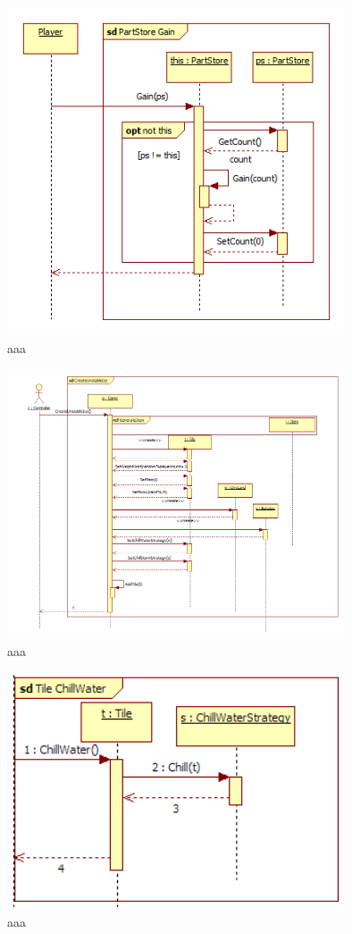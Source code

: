 \begin{figure}[H]
	\begin{center}
		\includegraphics[width=10cm]{chapters/chapter03/seqdiag/PartStore_Gain.png}
		\caption{aaa}
		\label{bbb}
	\end{center}
\end{figure}
\begin{figure}[H]
	\begin{center}
		\includegraphics[width=10cm]{chapters/chapter03/seqdiag/Game_CreateUnstableIce.png}
		\caption{aaa}
		\label{bbb}
	\end{center}
\end{figure}
\begin{figure}[H]
	\begin{center}
		\includegraphics[width=10cm]{chapters/chapter03/seqdiag/Tile_ChillWater.png}
		\caption{aaa}
		\label{bbb}
	\end{center}
\end{figure}
